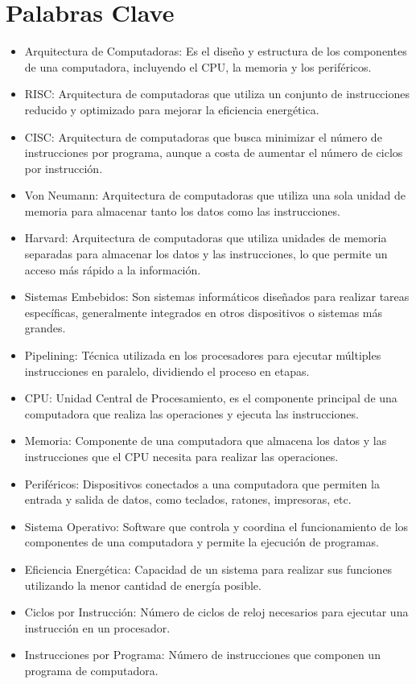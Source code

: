 \documentclass[12pt]{report}
\begin{document}
\chapter*{Palabras Clave}
\begin{itemize}
  \item Arquitectura de Computadoras: Es el diseño y estructura de los componentes de una computadora, incluyendo el CPU, la memoria y los periféricos.
  \item RISC: Arquitectura de computadoras que utiliza un conjunto de instrucciones reducido y optimizado para mejorar la eficiencia energética.
  \item CISC: Arquitectura de computadoras que busca minimizar el número de instrucciones por programa, aunque a costa de aumentar el número de ciclos por instrucción.
  \item Von Neumann: Arquitectura de computadoras que utiliza una sola unidad de memoria para almacenar tanto los datos como las instrucciones.
  \item Harvard: Arquitectura de computadoras que utiliza unidades de memoria separadas para almacenar los datos y las instrucciones, lo que permite un acceso más rápido a la información.
  \item Sistemas Embebidos: Son sistemas informáticos diseñados para realizar tareas específicas, generalmente integrados en otros dispositivos o sistemas más grandes.
  \item Pipelining: Técnica utilizada en los procesadores para ejecutar múltiples instrucciones en paralelo, dividiendo el proceso en etapas.
  \item CPU: Unidad Central de Procesamiento, es el componente principal de una computadora que realiza las operaciones y ejecuta las instrucciones.
  \item Memoria: Componente de una computadora que almacena los datos y las instrucciones que el CPU necesita para realizar las operaciones.
  \item Periféricos: Dispositivos conectados a una computadora que permiten la entrada y salida de datos, como teclados, ratones, impresoras, etc.
  \item Sistema Operativo: Software que controla y coordina el funcionamiento de los componentes de una computadora y permite la ejecución de programas.
  \item Eficiencia Energética: Capacidad de un sistema para realizar sus funciones utilizando la menor cantidad de energía posible.
  \item Ciclos por Instrucción: Número de ciclos de reloj necesarios para ejecutar una instrucción en un procesador.
  \item Instrucciones por Programa: Número de instrucciones que componen un programa de computadora.
\end{itemize}
\newpage
\end{document}
